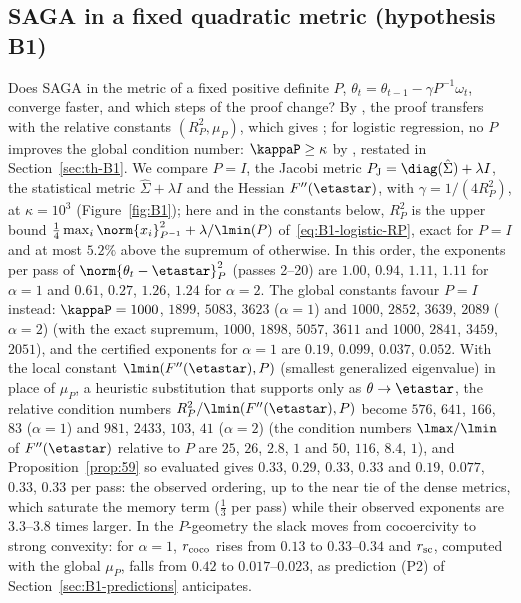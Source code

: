 \subsection{SAGA in a fixed quadratic metric (hypothesis B1)}\label{sec:exp-B1}

Does SAGA in the metric of a fixed positive definite $P$, $\theta_t=\theta_{t-1}-\gamma P^{-1}\omega_t$, converge faster,
and which steps of the proof change? By , the proof transfers with the relative constants
$(R_P^2,\mu_P)$, which gives ; for logistic regression, no $P$ improves the global condition number:
$\kappaP\ge\kappa$ by , restated in Section~\ref{sec:th-B1}. We compare $P=I$, the Jacobi
metric $P_{\rm J}=\diag(\hat\Sigma)+\lambda I$, the statistical metric $\hat\Sigma+\lambda I$ and the Hessian
$F''(\etastar)$, with $\gamma=1/(4R_P^2)$, at $\kappa=10^3$ (Figure~\ref{fig:B1}); here and in the constants below,
$R_P^2$ is the upper bound $\frac14\max_i\norm{x_i}_{P^{-1}}^2+\lambda/\lmin(P)$ of~\eqref{eq:B1-logistic-RP}, exact for
$P=I$ and at most $5.2\%$ above the supremum of  otherwise. In this order, the exponents per pass of
$\norm{\theta_t-\etastar}_P^2$ (passes 2--20) are $1.00$, $0.94$, $1.11$, $1.11$ for $\alpha=1$ and $0.61$, $0.27$,
$1.26$, $1.24$ for $\alpha=2$. The global constants favour $P=I$ instead: $\kappaP=1000$, $1899$, $5083$, $3623$
($\alpha=1$) and $1000$, $2852$, $3639$, $2089$ ($\alpha=2$) (with the exact supremum, $1000$, $1898$, $5057$, $3611$ and
$1000$, $2841$, $3459$, $2051$), and the certified exponents for $\alpha=1$ are $0.19$, $0.099$, $0.037$, $0.052$. With
the local constant $\lmin(F''(\etastar),P)$ (smallest generalized eigenvalue) in place of $\mu_P$, a heuristic
substitution that  supports only as $\theta\to\etastar$, the relative condition numbers
$R_P^2/\lmin(F''(\etastar),P)$ become $576$, $641$, $166$, $83$ ($\alpha=1$) and $981$, $2433$, $103$, $41$ ($\alpha=2$)
(the condition numbers $\lmax/\lmin$ of $F''(\etastar)$ relative to $P$ are $25$, $26$, $2.8$, $1$ and $50$, $116$, $8.4$,
$1$), and Proposition~\ref{prop:59} so evaluated gives $0.33$, $0.29$, $0.33$, $0.33$ and $0.19$, $0.077$, $0.33$, $0.33$
per pass: the observed ordering, up to the near tie of the dense metrics, which saturate the memory term ($\frac13$ per
pass) while their observed exponents are $3.3$--$3.8$ times larger. In the $P$-geometry the slack moves from cocoercivity
to strong convexity: for $\alpha=1$, $r_{\rm coco}$ rises from $0.13$ to $0.33$--$0.34$ and $r_{\rm sc}$, computed with
the global $\mu_P$, falls from $0.42$ to $0.017$--$0.023$, as prediction (P2) of Section~\ref{sec:B1-predictions} anticipates.

